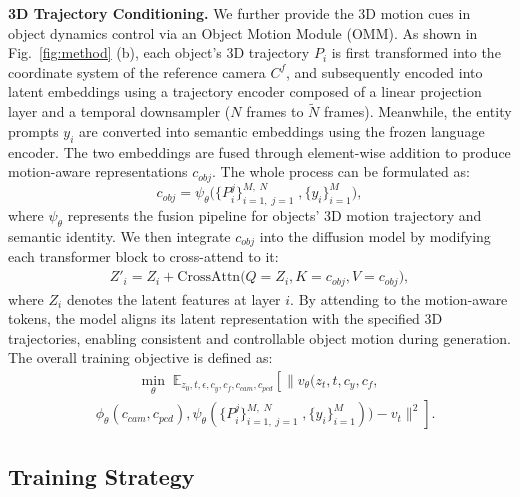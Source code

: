 \vspace{1mm}
\noindent\textbf{3D Trajectory Conditioning.}
We further provide the 3D motion cues in object dynamics control via an Object Motion Module (OMM). As shown in Fig.~\ref{fig:method} (b), each object’s 3D trajectory $P_i$ is first transformed into the coordinate system of the reference camera $C^f$, and subsequently encoded into latent embeddings using a trajectory encoder composed of a linear projection layer and a temporal downsampler ($N$ frames to $\tilde{N}$ frames). 
Meanwhile, the entity prompts $y_{i}$ are converted into semantic embeddings using the frozen language encoder.
The two embeddings are fused through element-wise addition to produce motion-aware representations $c_{obj}$. The whole process can be formulated as:
\begin{equation}
c_{obj}
= \psi_{\theta}\!\big(
\{ P_{i}^{j} \}_{i=1,\; j=1}^{M,\; N}\;, \{y_{i}\}_{i=1}^M
\big),
\end{equation}
where $\psi_{\theta}$ represents the fusion pipeline for objects' 3D motion trajectory and semantic identity.
We then integrate $c_{obj}$ into the diffusion model by modifying each transformer block to cross-attend to it:
\begin{equation}
\begin{array}{l}
Z'_i = Z_i + \mathrm{CrossAttn}\!\Big(
Q = Z_i,
K = c_{obj},
V = c_{obj}
\Big),
\end{array}
\end{equation}
where $Z_i$ denotes the latent features at layer $i$. By attending to the motion-aware tokens, the model aligns its latent representation with the specified 3D trajectories, enabling consistent and controllable object motion during generation. The overall training objective is defined as:
\begin{equation}
\label{eq:diffusion-train}
\begin{aligned}
    &\hspace{3em}
    \min_\theta \; \mathbb{E}_{z_0, t, \epsilon, c_{y}, c_{f}, c_{cam}, c_{pcd}}
    \left[\|v_\theta(z_t, t, c_{y}, c_{f}, \right.\\
    &\left. 
    \phi_{\theta}(c_{cam}, c_{pcd}),
    \psi_{\theta}\!(\{ P_{i}^{j} \}_{i=1,\; j=1}^{M,\; N}\;, \{y_{i}\}_{i=1}^M)) - v_t\|^2\right].
\end{aligned}
\end{equation}


\subsection{Training Strategy}
\label{sec:Training}


